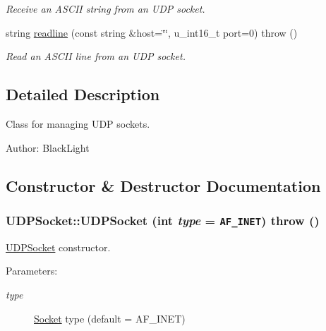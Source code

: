 \begin{CompactItemize}
\begin{CompactList}\small\item\em Receive an ASCII string from an UDP socket. \item\end{CompactList}\item 
string \hyperlink{classUDPSocket_f1643ac194b84e7e8e99e536736f9ff6}{readline} (const string \&host=\char`\"{}\char`\"{}, u\_\-int16\_\-t port=0)  throw ()
\begin{CompactList}\small\item\em Read an ASCII line from an UDP socket. \item\end{CompactList}\end{CompactItemize}


\subsection{Detailed Description}
Class for managing UDP sockets. 

\begin{Desc}
\item[Author:]BlackLight \end{Desc}


\subsection{Constructor \& Destructor Documentation}
\hypertarget{classUDPSocket_7e2e6eb3a4c3eec5538bdfd89441802b}{
\subsubsection[{UDPSocket}]{\setlength{\rightskip}{0pt plus 5cm}UDPSocket::UDPSocket (int {\em type} = {\tt AF\_\-INET})  throw ()}}
\label{classUDPSocket_7e2e6eb3a4c3eec5538bdfd89441802b}


\hyperlink{classUDPSocket}{UDPSocket} constructor. 

\begin{Desc}
\item[Parameters:]
\begin{description}
\item[{\em type}]\hyperlink{classSocket}{Socket} type (default = AF\_\-INET) \end{description}
\end{Desc}


